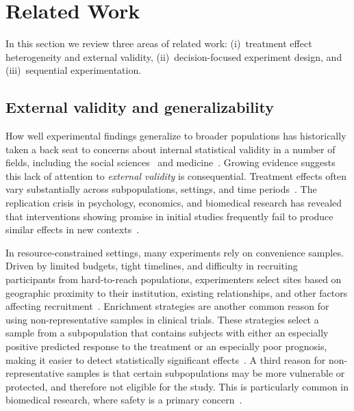 \section{Related Work}
\label{sec:related-work}

In this section we review three areas of related work: (i)~treatment effect heterogeneity and external validity, (ii)~decision-focused experiment design, and (iii)~sequential experimentation.

\subsection{External validity and generalizability}

How well experimental findings generalize to broader populations has historically taken a back seat to concerns about internal statistical validity in a number of fields, including the social sciences~\cite{EgamiHa23} and medicine~\cite{AverittWe20}.
Growing evidence suggests this lack of attention to \emph{external validity} is consequential.
Treatment effects often vary substantially across subpopulations, settings, and time periods~\cite{BryanTi21,Tipton21,Meager19,WilliamsCi22}.
The replication crisis in psychology, economics, and biomedical research has revealed that interventions showing promise in initial studies frequently fail to produce similar effects in new contexts~\cite{OpenScienceCollaboration15,CamererDr16,BegleyEl12,CommitteeonReproducibilityandReplicabilityinScienceBo19}.

In resource-constrained settings, many experiments rely on convenience samples.
Driven by limited budgets, tight timelines, and difficulty in recruiting participants from hard-to-reach populations, experimenters select sites based on geographic proximity to their institution, existing relationships, and other factors affecting recruitment~\cite{TiptonFe16,TiptonSp21}.
Enrichment strategies are another common reason for using non-representative samples in clinical trials.
These strategies select a sample from a subpopulation that contains subjects with either an especially positive predicted response to the treatment or an especially poor prognosis, making it easier to detect statistically significant effects~\cite{FDACD19,Thall21,SteingrimssonBe21}.
A third reason for non-representative samples is that certain subpopulations may be more vulnerable or protected, and therefore not eligible for the study.
This is particularly common in biomedical research, where safety is a primary concern~\cite{FDAHH20}.

